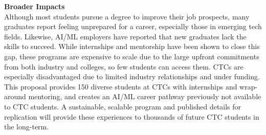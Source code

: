 \textbf{Broader Impacts} \\
Although most students pursue a degree to improve their job prospects, many graduates report feeling unprepared for a career, especially those in emerging tech fields. Likewise, AI/ML employers have reported that new graduates lack the skills to succeed. While internships and mentorship have been shown to close this gap, these programs are expensive to scale due to the large upfront commitments from both industry and colleges, so few students can access them. CTCs are especially disadvantaged due to limited industry relationships and under funding. This proposal provides 150 diverse students at CTCs with internships and wrap-around mentoring, and creates an AI/ML career pathway previously not available to CTC students. A sustainable, scalable program and published details for replication will provide these experiences to thousands of future CTC students in the long-term.


